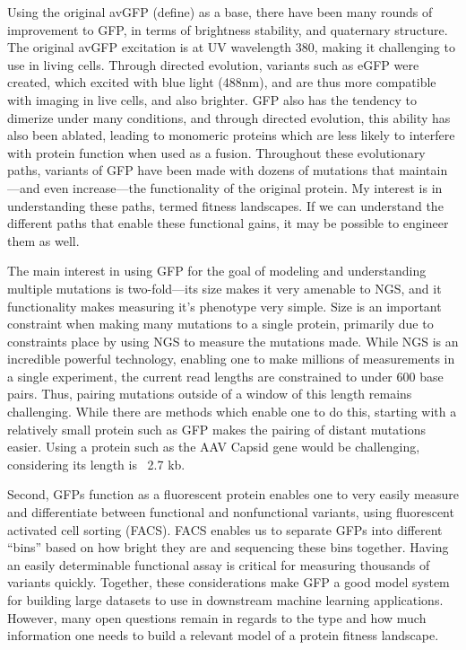 Using the original avGFP (define) as a base, there have been many rounds of improvement to GFP, in terms of brightness stability, and quaternary structure. The original avGFP excitation is at UV wavelength 380, making it challenging to use in living cells\cite{Prendergast1978-sr,Tsien1998-ur}. Through directed evolution, variants such as eGFP were created, which excited with blue light (488nm), and are thus more compatible with imaging in live cells, and also brighter. GFP also has the tendency to dimerize under many conditions\cite{Heim1995-lr}, and through directed evolution, this ability has also been ablated, leading to monomeric proteins which are less likely to interfere with protein function when used as a fusion. Throughout these evolutionary paths, variants of GFP have been made with dozens of mutations that maintain---and even increase---the functionality of the original protein. My interest is in understanding these paths, termed fitness landscapes. If we can understand the different paths that enable these functional gains, it may be possible to engineer them as well. 

The main interest in using GFP for the goal of modeling and understanding multiple mutations is two-fold---its size makes it very amenable to NGS, and it functionality makes measuring it’s phenotype very simple. Size is an important constraint when making many mutations to a single protein, primarily due to constraints place by using NGS to measure the mutations made. While NGS is an incredible powerful technology, enabling one to make millions of measurements in a single experiment, the current read lengths are constrained to under 600 base pairs. Thus, pairing mutations outside of a window of this length remains challenging. While there are methods which enable one to do this, starting with a relatively small protein such as GFP makes the pairing of distant mutations easier. Using a protein such as the AAV Capsid gene would be challenging, considering its length is ~2.7 kb.

Second, GFPs function as a fluorescent protein enables one to very easily measure and differentiate between functional and nonfunctional variants, using fluorescent activated cell sorting (FACS)\cite{Cossarizza2017-qx}. FACS enables us to separate GFPs into different “bins” based on how bright they are and sequencing these bins together. Having an easily determinable functional assay is critical for measuring thousands of variants quickly. Together, these considerations make GFP a good model system for building large datasets to use in downstream machine learning applications. However, many open questions remain in regards to the type and how much information one needs to build a relevant model of a protein fitness landscape\cite{Poelwijk2017-uh}. 


